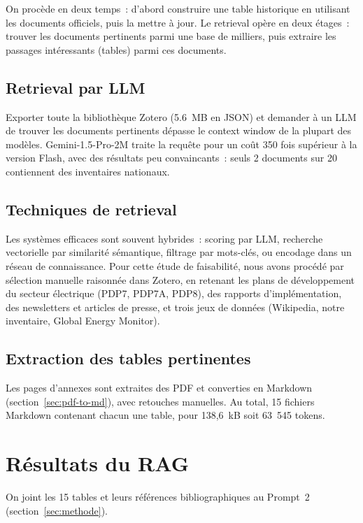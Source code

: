\documentclass[a4paper,11pt]{report}
\begin{document}
On procède en deux temps~: d'abord construire une table historique en utilisant les documents officiels, puis la mettre à jour. Le retrieval opère en deux étages~: trouver les documents pertinents parmi une base de milliers, puis extraire les passages intéressants (tables) parmi ces documents.

\subsection{Retrieval par LLM}

Exporter toute la bibliothèque Zotero (5.6~MB en JSON) et demander à un LLM de trouver les documents pertinents dépasse le context window de la plupart des modèles. Gemini-1.5-Pro-2M traite la requête pour un coût 350 fois supérieur à la version Flash, avec des résultats peu convaincants~: seuls 2 documents sur 20 contiennent des inventaires nationaux.

\subsection{Techniques de retrieval}

Les systèmes efficaces sont souvent hybrides~: scoring par LLM, recherche vectorielle par similarité sémantique, filtrage par mots-clés, ou encodage dans un réseau de connaissance. Pour cette étude de faisabilité, nous avons procédé par sélection manuelle raisonnée dans Zotero, en retenant les plans de développement du secteur électrique (PDP7, PDP7A, PDP8), des rapports d'implémentation, des newsletters et articles de presse, et trois jeux de données (Wikipedia, notre inventaire, Global Energy Monitor).

\subsection{Extraction des tables pertinentes}

Les pages d'annexes sont extraites des PDF et converties en Markdown (section~\ref{sec:pdf-to-md}), avec retouches manuelles. Au total, 15 fichiers Markdown contenant chacun une table, pour 138,6~kB soit 63~545 tokens.

\section{Résultats du RAG}

On joint les 15 tables et leurs références bibliographiques au Prompt~2 (section~\ref{sec:methode}).
\end{document}
